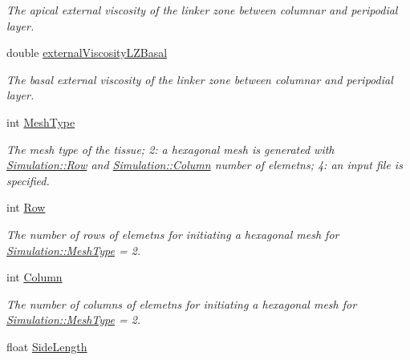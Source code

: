 \begin{DoxyCompactItemize}
\begin{DoxyCompactList}\small\item\em The apical external viscosity of the linker zone between columnar and peripodial layer. \end{DoxyCompactList}\item 
\hypertarget{classSimulation_a8bc411f696e2333c6501bd20fe0e4ab9}{}double \hyperlink{classSimulation_a8bc411f696e2333c6501bd20fe0e4ab9}{external\+Viscosity\+L\+Z\+Basal}\label{classSimulation_a8bc411f696e2333c6501bd20fe0e4ab9}

\begin{DoxyCompactList}\small\item\em The basal external viscosity of the linker zone between columnar and peripodial layer. \end{DoxyCompactList}\item 
\hypertarget{classSimulation_a3dc59b7f2368423781a41b0a457af1e4}{}int \hyperlink{classSimulation_a3dc59b7f2368423781a41b0a457af1e4}{Mesh\+Type}\label{classSimulation_a3dc59b7f2368423781a41b0a457af1e4}

\begin{DoxyCompactList}\small\item\em The mesh type of the tissue; 2\+: a hexagonal mesh is generated with \hyperlink{classSimulation_a7e232e744b0c21c7d878dc454e74b898}{Simulation\+::\+Row} and \hyperlink{classSimulation_ad700818601343ea02758de553eaab8e3}{Simulation\+::\+Column} number of elemetns; 4\+: an input file is specified. \end{DoxyCompactList}\item 
\hypertarget{classSimulation_a7e232e744b0c21c7d878dc454e74b898}{}int \hyperlink{classSimulation_a7e232e744b0c21c7d878dc454e74b898}{Row}\label{classSimulation_a7e232e744b0c21c7d878dc454e74b898}

\begin{DoxyCompactList}\small\item\em The number of rows of elemetns for initiating a hexagonal mesh for \hyperlink{classSimulation_a3dc59b7f2368423781a41b0a457af1e4}{Simulation\+::\+Mesh\+Type} = 2. \end{DoxyCompactList}\item 
\hypertarget{classSimulation_ad700818601343ea02758de553eaab8e3}{}int \hyperlink{classSimulation_ad700818601343ea02758de553eaab8e3}{Column}\label{classSimulation_ad700818601343ea02758de553eaab8e3}

\begin{DoxyCompactList}\small\item\em The number of columns of elemetns for initiating a hexagonal mesh for \hyperlink{classSimulation_a3dc59b7f2368423781a41b0a457af1e4}{Simulation\+::\+Mesh\+Type} = 2. \end{DoxyCompactList}\item 
\hypertarget{classSimulation_a8f79cab9b0ff8dc3802e1bf1f903d1c7}{}float \hyperlink{classSimulation_a8f79cab9b0ff8dc3802e1bf1f903d1c7}{Side\+Length}\label{classSimulation_a8f79cab9b0ff8dc3802e1bf1f903d1c7}


\end{DoxyCompactItemize}
